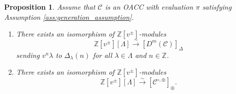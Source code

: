 \documentclass{amsart}
\newcommand{\Z}{\mathbb{Z}}
\newcommand{\scrC}{\mathcal{C}}
\newtheorem{proposition}[subsubsection]{Proposition}
\theoremstyle{definition}
\numberwithin{equation}{subsection}
\begin{document}
\begin{proposition}\label{prop:OACC_and_categorification}
    Assume that $\scrC$ is an OACC with evaluation $\pi$ satisfying Assumption \ref{ass:generation_assumption}. 
    \begin{enumerate}
        \item There exists an isomorphism of $\Z [v^{\pm}]$-modules
        \[\Z [v^{\pm}] [\Lambda] \stackrel{\sim}{\to} [D^m (\scrC)]_{\Delta} \]
        sending $v^n \lambda$ to $\Delta_{\lambda} (n)$ for all $\lambda \in \Lambda$ and $n \in \Z$.
        \item There exists an isomorphism of $\Z [v^{\pm}]$-modules
        \[\Z [v^{\pm}] [\Lambda] \stackrel{\sim}{\to} [\scrC^{\circ, \oplus}]_{\oplus}. \]
    \end{enumerate}
\end{proposition}
\end{document}
